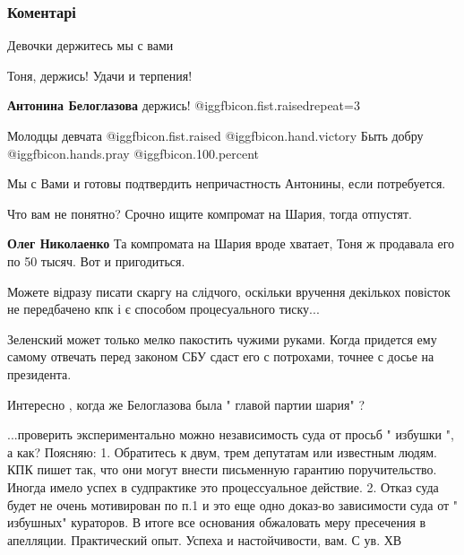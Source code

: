  
 
 
 
 
\subsubsection{Коментарі}
\label{sec:27_09_2021.fb.medvedeva_olesja.1.antonina_beloglazova_sbu.cmt}

\begin{itemize} %
Девочки держитесь мы с вами

Тоня, держись! Удачи и терпения!

\textbf{Антонина Белоглазова} держись!  @igg{fbicon.fist.raised}{repeat=3} 

Молодцы девчата @igg{fbicon.fist.raised}  @igg{fbicon.hand.victory}
Быть добру  @igg{fbicon.hands.pray}  @igg{fbicon.100.percent} 

Мы с Вами и готовы подтвердить непричастность Антонины, если потребуется.

Что вам не понятно? Срочно ищите компромат на Шария, тогда отпустят.

\begin{itemize} %
\textbf{Олег Николаенко} Та компромата на Шария вроде хватает, Тоня ж продавала его по 50 тысяч. Вот и пригодиться.
\end{itemize} %

Можете відразу писати скаргу на слідчого, оскільки вручення декількох повісток не передбачено кпк і є способом процесуального тиску...

Зеленский может только мелко пакостить чужими руками. Когда придется ему самому отвечать перед законом СБУ сдаст его с потрохами, точнее с досье на президента.

Интересно , когда же Белоглазова была " главой партии шария" ?


...проверить экспериментально можно независимость суда от просьб " избушки ", а
как? Поясняю: 1. Обратитесь к двум, трем депутатам или известным людям. КПК
пишет так, что они могут внести письменную гарантию поручительство. Иногда
имело успех в судпрактике это процессуальное действие. 2. Отказ суда будет не
очень мотивирован по п.1 и это еще одно доказ-во зависимости суда от "
избушных" кураторов. В итоге все основания обжаловать меру пресечения в
апелляции. Практический опыт. Успеха и настойчивости, вам. С ув. ХВ


\end{itemize}
